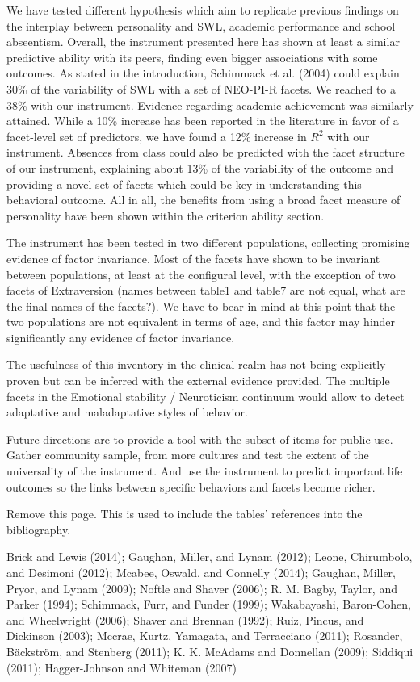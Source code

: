 \documentclass[,man,floatsintext]{apa6}
\begin{document}
We have tested different hypothesis which aim to replicate previous
findings on the interplay between personality and SWL, academic
performance and school abseentism. Overall, the instrument presented
here has shown at least a similar predictive ability with its peers,
finding even bigger associations with some outcomes. As stated in the
introduction, Schimmack et al. (2004) could explain 30\% of the
variability of SWL with a set of NEO-PI-R facets. We reached to a 38\%
with our instrument. Evidence regarding academic achievement was
similarly attained. While a 10\% increase has been reported in the
literature in favor of a facet-level set of predictors, we have found a
12\% increase in \(R^2\) with our instrument. Absences from class could
also be predicted with the facet structure of our instrument, explaining
about 13\% of the variability of the outcome and providing a novel set
of facets which could be key in understanding this behavioral outcome.
All in all, the benefits from using a broad facet measure of personality
have been shown within the criterion ability section.

The instrument has been tested in two different populations, collecting
promising evidence of factor invariance. Most of the facets have shown
to be invariant between populations, at least at the configural level,
with the exception of two facets of Extraversion (names between table1
and table7 are not equal, what are the final names of the facets?). We
have to bear in mind at this point that the two populations are not
equivalent in terms of age, and this factor may hinder significantly any
evidence of factor invariance.

The usefulness of this inventory in the clinical realm has not being
explicitly proven but can be inferred with the external evidence
provided. The multiple facets in the Emotional stability / Neuroticism
continuum would allow to detect adaptative and maladaptative styles of
behavior.

Future directions are to provide a tool with the subset of items for
public use. Gather community sample, from more cultures and test the
extent of the universality of the instrument. And use the instrument to
predict important life outcomes so the links between specific behaviors
and facets become richer.

\newpage

Remove this page. This is used to include the tables' references into
the bibliography.

Brick and Lewis (2014); Gaughan, Miller, and Lynam (2012); Leone,
Chirumbolo, and Desimoni (2012); Mcabee, Oswald, and Connelly (2014);
Gaughan, Miller, Pryor, and Lynam (2009); Noftle and Shaver (2006); R.
M. Bagby, Taylor, and Parker (1994); Schimmack, Furr, and Funder (1999);
Wakabayashi, Baron-Cohen, and Wheelwright (2006); Shaver and Brennan
(1992); Ruiz, Pincus, and Dickinson (2003); Mccrae, Kurtz, Yamagata, and
Terracciano (2011); Rosander, Bäckström, and Stenberg (2011); K. K.
McAdams and Donnellan (2009); Siddiqui (2011); Hagger-Johnson and
Whiteman (2007)
\end{document}
